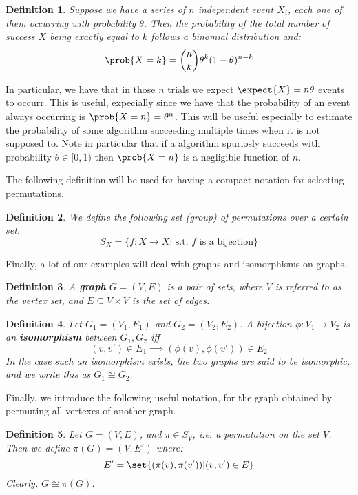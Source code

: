 \documentclass{article}
\newtheorem{definition}{Definition}
\begin{document}
\begin{definition}
    Suppose we have a series of $n$ independent event $X_i$, each one of them
    occurring with probability $\theta$. Then the probability of the total number of success $X$ being exactly equal to $k$ follows a binomial distribution and:
    \[ \prob{X = k} = \binom{n}{k} \theta^k (1 - \theta)^{n - k} \]
\end{definition}
In particular, we have that in those $n$ trials we expect $\expect{X} = n\theta$ events to occurr. This is useful, expecially since
we have that the probability of an event always occurring is $\prob{X = n} = \theta^n$. This will be useful especially
to  estimate the probability of some algorithm succeeding multiple times when it is not supposed to.
Note in particular that if a algorithm spuriosly succeeds with probability $\theta \in [0, 1)$ then $\prob{X = n}$ is a
negligible function of $n$. \par

The following definition will be used for having a compact notation for selecting permutations.

\begin{definition}
    We define the following set (group) of permutations over a certain set.
    \[ S_X = \{ f: X \to X | \text{ s.t. } f \text{ is a bijection} \} \]
\end{definition}

Finally, a lot of our examples will deal with graphs and isomorphisms on graphs.

\begin{definition}
    A \textbf{graph} $G = (V, E)$ is a pair of sets, where $V$ is referred to as the vertex set, and $E \subseteq V \times V$ is the set of edges.
\end{definition}

\begin{definition}
    Let $G_1 = (V_1, E_1)$ and $G_2 = (V_2, E_2)$. A bijection $\phi: V_1 \to V_2$ is an \textbf{isomorphism} between $G_1, G_2$ iff
    \[ (v, v') \in E_1 \implies (\phi(v), \phi(v')) \in E_2 \]
    In the case such an isomorphism exists, the two graphs are said to be isomorphic, and we write this as $G_1 \cong G_2$.
\end{definition}

Finally, we introduce the following useful notation, for the graph obtained by permuting all vertexes of another graph.
\begin{definition}
    Let $G = (V, E)$, and $\pi \in S_V$, i.e. a permutation on the set $V$. Then we define $\pi(G) = (V, E')$ where:
    \[ E' = \set{ (\pi(v), \pi(v')) | (v, v') \in E } \]
    Clearly, $G \cong \pi(G)$.
\end{definition}
\end{document}
